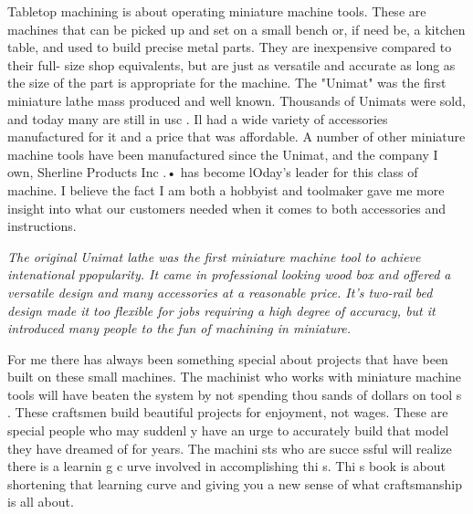 \secdown
\secdown


Tabletop machining is about operating miniature machine tools. These are
machines that can be picked up and set on a small bench or, if need be, a
kitchen table, and used to build precise metal parts. They are inexpensive
compared to their full- size shop equivalents, but are just as versatile and
accurate as long as the size of the part is appropriate for the machine. The
"Unimat" was the first miniature lathe mass produced and well known. Thousands
of Unimats were sold, and today many are still in usc . Il had a wide variety of
accessories manufactured for it and a price that was affordable. A number of
other miniature machine tools have been manufactured since the Unimat, and the
company I own, Sherline Products Inc .• has become lOday's leader for this class
of machine. I believe the fact I am both a hobbyist and toolmaker gave me more
insight into what our customers needed when it comes to both accessories and
instructions.

\bigskip\noindent
\textit{The original Unimat lathe was the first miniature machine tool to
achieve intenational ppopularity. It came in professional looking wood box and
offered a versatile design and many accessories at a reasonable price. It's
two-rail bed design made it too flexible for jobs requiring a high degree of
accuracy, but it introduced many people to the fun of machining in miniature.}
\bigskip


For me there has always been something special about projects that have been
built on these small machines. The machinist who works with miniature machine
tools will have beaten the system by not spending thou sands of dollars on tool
s . These craftsmen build beautiful projects for enjoyment, not wages. These are
special people who may suddenl y have an urge to accurately build that model
they have dreamed of for years. The machini sts who are succe ssful will realize
there is a learnin g c urve involved in accomplishing thi s. Thi s book is about
shortening that learning curve and giving you a new sense of what craftsmanship
is all about.


